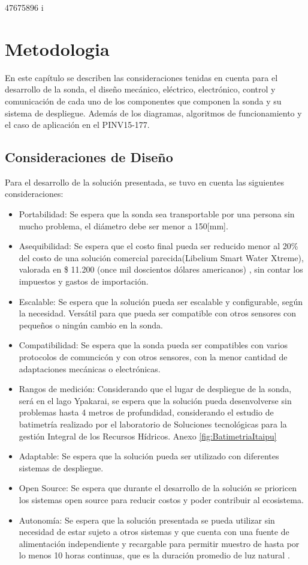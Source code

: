  47675896 i\chapter[Metodolog\'ia.]{Metodologia}
\pagestyle{fancy}

En este cap\'itulo se describen las consideraciones tenidas en cuenta para el desarrollo de la sonda, el diseño mec\'anico, el\'ectrico, electr\'onico, control y comunicaci\'on de cada uno de los componentes que componen la sonda y su sistema de despliegue. Adem\'as de los diagramas, algoritmos de funcionamiento y el caso de aplicaci\'on en el PINV15-177.

\section[Consideraciones del sistema]{Consideraciones de Dise\~no}
Para el desarrollo de la soluci\'on presentada, se tuvo en cuenta las siguientes consideraciones:
\begin{itemize}
    \item Portabilidad: Se espera que la sonda sea transportable por una persona sin mucho problema, el di\'ametro debe ser menor a 150[mm].
    \item Asequibilidad: Se espera que el costo final pueda ser reducido menor al 20\% del costo de una soluci\'on comercial parecida(Libelium Smart Water Xtreme), valorada en \$ 11.200 (once mil doscientos d\'olares americanos) \cite{storeLibelium}, sin contar los impuestos y gastos de importaci\'on.  
    \item Escalable: Se espera que la soluci\'on pueda ser escalable y configurable, seg\'un la necesidad. Vers\'atil para que pueda ser compatible con otros sensores con peque\~nos o ningún cambio en la sonda.
    \item Compatibilidad: Se espera que la sonda pueda ser compatibles con varios protocolos de comuncic\'on y con otros sensores, con la menor cantidad de adaptaciones mec\'anicas o electr\'onicas. 
    \item Rangos de medici\'on: Considerando que el lugar de despliegue de la sonda, ser\'a en el lago Ypakarai, se espera que la soluci\'on pueda desenvolverse sin problemas hasta 4 metros de profundidad, considerando el estudio de batimetr\'ia realizado por el laboratorio de Soluciones tecnol\'ogicas para la gesti\'on Integral de los Recursos H\'idricos. Anexo \ref{fig:BatimetriaItaipu}
    \item Adaptable: Se espera que la soluci\'on pueda ser utilizado con diferentes sistemas de despliegue.
    \item Open Source: Se espera que durante el desarrollo de la soluci\'on se prioricen los sistemas open source para reducir costos y poder contribuir al ecosistema. 
    \item Autonom\'ia: Se espera que la soluci\'on presentada se pueda utilizar sin necesidad de estar sujeto a otros sistemas y que cuenta con una fuente de alimentaci\'on independiente y recargable para permitir muestro de hasta por lo menos 10 horas continuas, que es la duraci\'on promedio de luz natural \cite{ClimaSol}. 
    
\end{itemize}

